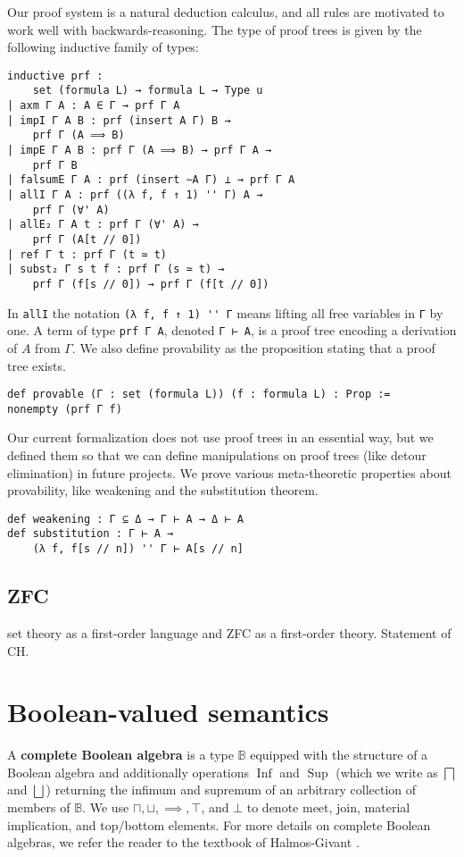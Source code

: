 \documentclass[sigplan,10pt,review, anonymous]{acmart}
\newcommand{\B}{\mathbb{B}}
\newcommand{\lil}{\lstinline}
\theoremstyle{definition}
\newcommand{\lil}{\lstinline}
\newcommand{\B}{\mathbb{B}}
\begin{document}
Our proof system is a natural deduction calculus, and all rules are motivated to work well with backwards-reasoning. The type of proof trees is given by the following inductive family of types:
\begin{lstlisting}
inductive prf :
    set (formula L) → formula L → Type u
| axm Γ A : A ∈ Γ → prf Γ A
| impI Γ A B : prf (insert A Γ) B →
    prf Γ (A ⟹ B)
| impE Γ A B : prf Γ (A ⟹ B) → prf Γ A →
    prf Γ B
| falsumE Γ A : prf (insert ∼A Γ) ⊥ → prf Γ A
| allI Γ A : prf ((λ f, f ↑ 1) '' Γ) A →
    prf Γ (∀' A)
| allE₂ Γ A t : prf Γ (∀' A) →
    prf Γ (A[t // 0])
| ref Γ t : prf Γ (t ≃ t)
| subst₂ Γ s t f : prf Γ (s ≃ t) →
    prf Γ (f[s // 0]) → prf Γ (f[t // 0])
\end{lstlisting}
In \lil{allI} the notation \lil{(λ f, f ↑ 1) '' Γ} means lifting all free variables in \lil{Γ} by one.
A term of type \lil{prf Γ A}, denoted \lil{Γ ⊢ A}, is a proof tree encoding a derivation of $A$ from $\Gamma$.
We also define provability as the proposition stating that a proof tree exists.
\begin{lstlisting}
def provable (Γ : set (formula L)) (f : formula L) : Prop :=
nonempty (prf Γ f)
\end{lstlisting}
Our current formalization does not use proof trees in an essential way, but we defined them so that we can define manipulations on proof trees (like detour elimination) in future projects.
We prove various meta-theoretic properties about provability, like weakening and the substitution theorem.
\begin{lstlisting}
def weakening : Γ ⊆ Δ → Γ ⊢ A → Δ ⊢ A
def substitution : Γ ⊢ A →
    (λ f, f[s // n]) '' Γ ⊢ A[s // n]
\end{lstlisting}
\subsection{ZFC}
\label{subsection:fol:zfc}

set theory as a first-order language and ZFC as a first-order theory. Statement of CH.

\section{Boolean-valued semantics}
\label{section:boolean-semantics}

A \textbf{complete Boolean algebra} is a type $\B$ equipped with the structure of a Boolean algebra and additionally operations $\operatorname{Inf}$ and $\operatorname{Sup}$ (which we write as $\bigsqcap$ and $\bigsqcup$) returning the infimum and supremum of an arbitrary collection of members of $\B$.
We use $\sqcap, \sqcup, \implies, \top$, and $\bot$ to denote meet, join, material implication, and top/bottom elements.
For more details on complete Boolean algebras, we refer the reader to the textbook of Halmos-Givant \cite{givant2008introduction}.
\end{document}
